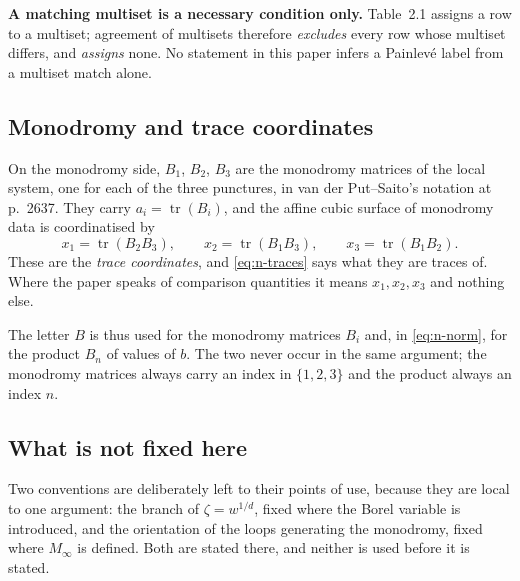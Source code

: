 \textbf{A matching multiset is a necessary condition only.} Table~2.1 assigns a
row to a multiset; agreement of multisets therefore \emph{excludes} every row
whose multiset differs, and \emph{assigns} none. No statement in this paper
infers a Painlev\'e label from a multiset match alone.

\subsection{Monodromy and trace coordinates}\label{ssec:traces}

On the monodromy side, $B_1$, $B_2$, $B_3$ are the monodromy matrices of the
local system, one for each of the three punctures, in van der Put--Saito's
notation at p.~2637. They carry $a_i=\operatorname{tr}(B_i)$, and the affine
cubic surface of monodromy data is coordinatised by
\begin{equation}\label{eq:n-traces}
  x_1=\operatorname{tr}(B_2B_3),\qquad
  x_2=\operatorname{tr}(B_1B_3),\qquad
  x_3=\operatorname{tr}(B_1B_2).
\end{equation}
These are the \emph{trace coordinates}, and \eqref{eq:n-traces} says what they
are traces of. Where the paper speaks of comparison quantities it means
$x_1,x_2,x_3$ and nothing else.

The letter $B$ is thus used for the monodromy matrices $B_i$ and, in
\eqref{eq:n-norm}, for the product $B_n$ of values of $b$. The two never occur
in the same argument; the monodromy matrices always carry an index in
$\{1,2,3\}$ and the product always an index $n$.

\subsection{What is not fixed here}\label{ssec:notfixed}

Two conventions are deliberately left to their points of use, because they are
local to one argument: the branch of $\zeta=w^{1/d}$, fixed where the Borel
variable is introduced, and the orientation of the loops generating the
monodromy, fixed where $M_\infty$ is defined. Both are stated there, and
neither is used before it is stated.
